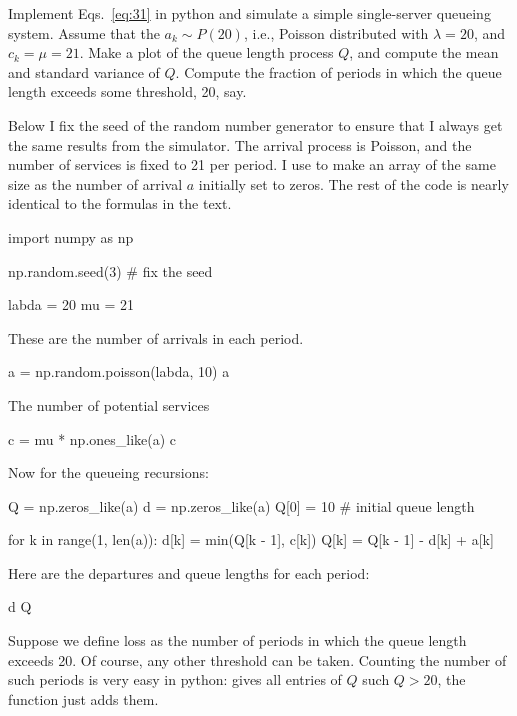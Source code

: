 \begin{exercise}
  Implement Eqs.~\ref{eq:31} in python and simulate a
  simple single-server queueing system. Assume that the $a_k \sim P(20)$, i.e., Poisson distributed with $\lambda=20$, and $c_k =\mu=21$. Make a plot of the queue length process $Q$, and compute the mean and standard variance of $Q$. Compute the fraction of periods in which the queue length exceeds some threshold, 20, say. 
  \begin{solution}
    Below I fix the seed of the random number generator to ensure that
    I always get the same results from the simulator.  The arrival
    process is Poisson, and the number of services is fixed to 21 per
    period. I use  to make an array of the
    same size as the number of arrival $a$ initially set to zeros. The
    rest of the code is nearly identical to the formulas in the text.

\begin{pyconsole}
import numpy as np

np.random.seed(3) # fix the seed

labda = 20
mu = 21
\end{pyconsole}

These are the number of arrivals in each period.

\begin{pyconsole}
a = np.random.poisson(labda, 10)
a
\end{pyconsole}

The number of potential services
\begin{pyconsole}
c = mu * np.ones_like(a)
c
\end{pyconsole}

Now for the queueing recursions:

\begin{pyconsole}
Q = np.zeros_like(a)
d = np.zeros_like(a)
Q[0] = 10  # initial queue length

for k in range(1, len(a)):
    d[k] = min(Q[k - 1], c[k])
    Q[k] = Q[k - 1] - d[k] + a[k]

\end{pyconsole}

Here are the departures and queue lengths for each period:
\begin{pyconsole}
d
Q
\end{pyconsole}


Suppose we define loss as the number of periods in which the queue length exceeds
20. Of course, any other threshold can be taken. Counting the number
of such periods is very easy in python:  gives all
entries of $Q$ such $Q>20$, the function  just adds
them. 


\end{solution}
\end{exercise}
